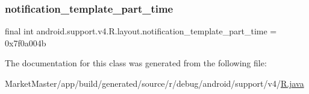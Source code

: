 \mbox{\label{classandroid_1_1support_1_1v4_1_1R_1_1layout_a9fb910fd134e67244f19fc9e38e6ba2c}} 
\subsubsection{\texorpdfstring{notification\+\_\+template\+\_\+part\+\_\+time}{notification\_template\_part\_time}}
{\footnotesize\ttfamily final int android.\+support.\+v4.\+R.\+layout.\+notification\+\_\+template\+\_\+part\+\_\+time = 0x7f0a004b\hspace{0.3cm}{\ttfamily [static]}}



The documentation for this class was generated from the following file\+:\begin{DoxyCompactItemize}
\item 
Market\+Master/app/build/generated/source/r/debug/android/support/v4/\mbox{\hyperlink{debug_2android_2support_2v4_2R_8java}{R.\+java}}\end{DoxyCompactItemize}
